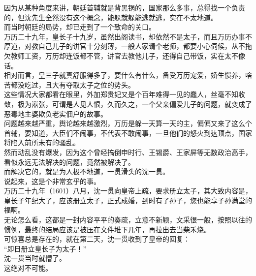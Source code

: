 \begin{multicols}{\theparacolNo}
因为从某种角度来讲，朝廷首辅就是背黑锅的，国家那么多事，总得找一个负责的，但沈先生全然没有这个概念，能躲就躲能逃就逃，实在不太地道。\\

而当时朝廷的局势，却已走到了一个致命的关口。\\

万历二十九年，皇长子十九岁，虽然出阁读书，却依然不是太子，而且万历办事不厚道，对教自己儿子的讲官十分刻薄，一般人家请个老师，都要小心伺候，从不拖欠教师工资，万历却连饭都不管，讲官去教他儿子，还得自己带饭，实在太不像话。\\

相对而言，皇三子就真舒服得多了，要什么有什么，备受万历宠爱，娇生惯养，啥苦都没吃过，且大有夺取太子之位的势头。\\

这些情况大家都看在眼里，外加郑贵妃又是个百年难得一见的蠢人，丝毫不知收敛，极为嚣张，可谓是人见人恨，久而久之，一个父亲偏爱儿子的问题，就变成了恶毒地主婆欺负老实佃户的故事。\\

问题越来越严重，舆论越来越激烈，万历是躲一天算一天的主，偏偏又来了这么个首辅，要知道，大臣们不闹事，不代表不敢闹事，一旦他们的怒火到达顶点，国家将陷入前所未有的骚乱。\\

然而动乱没有爆发，因为这个曾经搞倒申时行、王锡爵、王家屏等无数政治高手，看似永远无法解决的问题，竟然被解决了。\\

而解决它的，就是为人极不地道，一贯滑头的沈一贯。\\

说起来，这是个非常玄乎的事。\\

万历二十九年（1601）八月，沈一贯向皇帝上疏，要求册立太子，其大致内容是，皇长子年纪大了，应该册立太子，正式成婚，到时有了孙子，您也能享子孙满堂的福啊。\\

无论怎么看，这都是一封内容平平的奏疏，立意不新颖，文采很一般，按照以往的惯例，最终的结局应该是被压在文件堆下几年，再拉出去当柴禾烧。\\

可惊喜总是存在的，就在第二天，沈一贯收到了皇帝的回复：\\

“即日册立皇长子为太子！”\\

沈一贯当时就懵了。\\

这绝对不可能。\\


\end{multicols}
